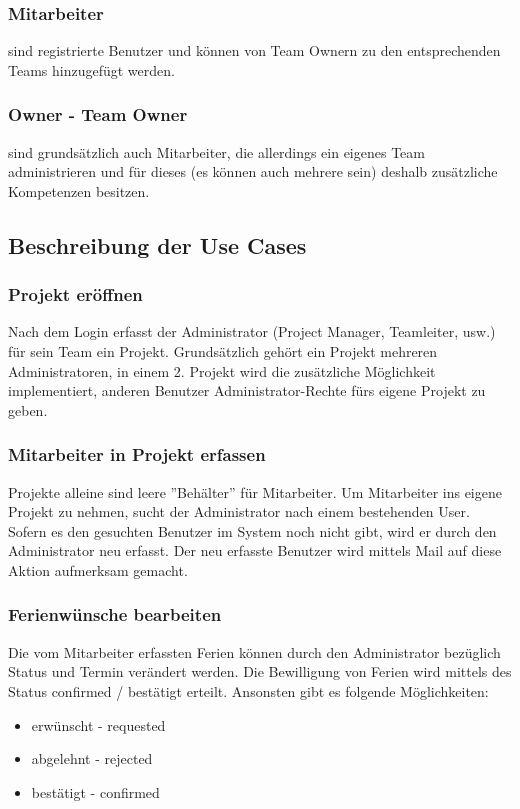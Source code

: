 \subsubsection{Mitarbeiter} sind registrierte Benutzer und k\"onnen von Team Ownern zu den entsprechenden Teams hinzugef\"ugt werden. 
\subsubsection{Owner - Team Owner} sind grunds\"atzlich auch Mitarbeiter, die allerdings ein eigenes Team administrieren und f\"ur dieses (es k\"onnen auch mehrere sein) deshalb zus\"atzliche Kompetenzen besitzen.

\subsection{Beschreibung der Use Cases}
\subsubsection{Projekt er\"offnen}
Nach dem Login erfasst der Administrator (Project Manager, Teamleiter, usw.) f\"ur sein Team ein Projekt. Grunds\"atzlich geh\"ort ein Projekt mehreren Administratoren, in einem 2. Projekt wird die zus\"atzliche M\"oglichkeit implementiert, anderen Benutzer Administrator-Rechte f\"urs eigene Projekt zu geben.

\subsubsection{Mitarbeiter in Projekt erfassen}
Projekte alleine sind leere ''Beh\"alter'' f\"ur Mitarbeiter. Um Mitarbeiter ins eigene Projekt zu nehmen, sucht der Administrator nach einem bestehenden User. Sofern es den gesuchten Benutzer im System noch nicht gibt, wird er durch den Administrator neu erfasst. Der neu erfasste Benutzer wird mittels Mail auf diese Aktion aufmerksam gemacht.

\subsubsection{Ferienw\"unsche bearbeiten}
Die vom Mitarbeiter erfassten Ferien k\"onnen durch den Administrator bez\"uglich Status und Termin ver\"andert werden. Die Bewilligung von Ferien wird mittels des Status confirmed / best\"atigt erteilt. Ansonsten gibt es folgende M\"oglichkeiten:
\begin{itemize}
\item erw\"unscht - requested
\item abgelehnt - rejected
\item best\"atigt - confirmed
\end{itemize}

